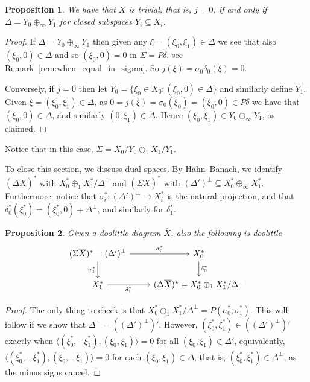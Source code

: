 \documentclass[a4paper,11pt]{article}
\theoremstyle{plain}
\newtheorem{proposition}{Proposition}[section]
\theoremstyle{remark}
\newcommand{\ip}[2]{{\langle {#1} , {#2} \rangle}}
\begin{document}
\begin{proposition}\label{prop:when_j_zero}
We have that $\overline X$ is trivial, that is, $j=0$, if and only if $\Delta = Y_0 \oplus_\infty Y_1$ for closed subspaces $Y_i \subseteq X_i$.
\end{proposition}
\begin{proof}
If $\Delta = Y_0 \oplus_\infty Y_1$ then given any $\xi=(\xi_0,\xi_1)\in \Delta$ we see that also $(\xi_0,0) \in \Delta$ and so $(\xi_0,0) = 0$ in $\Sigma = P\delta$, see Remark~\ref{rem:when_equal_in_sigma}.  So $j(\xi) = \sigma_0 \delta_0(\xi)=0$.

Conversely, if $j=0$ then let $Y_0 = \{ \xi_0\in X_0 : (\xi_0,0)\in \Delta \}$ and similarly define $Y_1$.  Given $\xi=(\xi_0,\xi_1)\in \Delta$, as $0 = j(\xi) = \sigma_0(\xi_0) = (\xi_0,0) \in P\delta$ we have that $(\xi_0,0) \in \Delta$, and similarly $(0,\xi_1)\in\Delta$.  Hence $(\xi_0,\xi_1) \in Y_0 \oplus_\infty Y_1$, as claimed.
\end{proof}

Notice that in this case, $\Sigma = X_0/Y_0 \oplus_1 X_1/Y_1$.

To close this section, we discuss dual spaces.  By Hahn--Banach, we identify $(\Delta\overline X)^*$ with $X_0^* \oplus_1 X_1^* / \Delta^\perp$ and $(\Sigma\overline X)^*$ with $(\Delta')^\perp \subseteq X_0^* \oplus_\infty X_1^*$.  Furthermore, notice that $\sigma_i^* \colon (\Delta')^\perp \to X_i^*$ is the natural projection, and that $\delta_0^*(\xi_0^*) = (\xi_0^*,0) + \Delta^\perp$, and similarly for $\delta_1^*$.

\begin{proposition}\label{prop:dual}
Given a doolittle diagram $\overline X$, also the following is doolittle
\begin{equation} \begin{tikzcd}
(\Sigma\overline X)^* = (\Delta')^\perp  \arrow[r, "\sigma_0^*"] \arrow[d, "\sigma_1^*"'] & X_0^* \arrow[d, "\delta_0^*"]\\
X_1^* \arrow[r, "\delta_1^*"'] & (\Delta\overline X)^* = X_0^* \oplus_1 X_1^* / \Delta^\perp
\end{tikzcd} \label{eq:dual_doolittle_diagram}
\end{equation}
\end{proposition}
\begin{proof}
The only thing to check is that $X_0^* \oplus_1 X_1^* / \Delta^\perp = P(\sigma_0^*, \sigma_1^*)$.  This will follow if we show that $\Delta^\perp = ((\Delta')^\perp)'$.  However, $(\xi_0^*, \xi_1^*) \in ((\Delta')^\perp)'$ exactly when $\ip{(\xi_0^*, -\xi_1^*)}{(\xi_0,\xi_1)}=0$ for all $(\xi_0,\xi_1) \in \Delta'$, equivalently, $\ip{(\xi_0^*, -\xi_1^*)}{(\xi_0,-\xi_1)}=0$ for each $(\xi_0,\xi_1)\in \Delta$, that is, $(\xi_0^*, \xi_1^*) \in \Delta^\perp$, as the minus signs cancel.
\end{proof}
\end{document}
